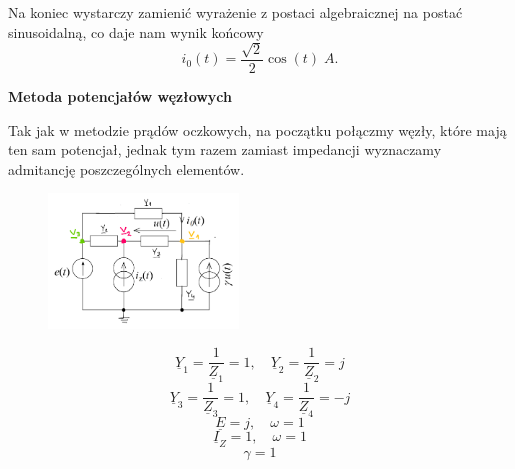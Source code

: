 \documentclass[12pt, a4paper]{article}
\begin{document}
Na koniec wystarczy zamienić wyrażenie z postaci algebraicznej na postać sinusoidalną,
co daje nam wynik końcowy
\begin{equation*}
  i_0(t) = \frac{\sqrt{2}}{2}\cos(t)\; A.
\end{equation*}

\begin{flushleft}
  \textbf{Metoda potencjałów węzłowych}
\end{flushleft}

Tak jak w metodzie prądów oczkowych, na początku połączmy węzły, które mają
ten sam potencjał, jednak tym razem zamiast impedancji wyznaczamy admitancję
poszczególnych elementów.
\begin{figure}[H]
  \centering
  \includegraphics[width = 0.45\textwidth]{./images/Lista_3/3.2.3_MPV.png}
\end{figure}

\begin{equation*}
  \underline{Y}_1 = \frac{1}{\underline{Z}_1} = 1, \quad \underline{Y}_2 = \frac{1}{\underline{Z}_2} = j
\end{equation*}
\begin{equation*}
  \underline{Y}_3 = \frac{1}{\underline{Z}_3} = 1, \quad \underline{Y}_4 = \frac{1}{\underline{Z}_4} = -j
\end{equation*}
\begin{equation*}
  \underline{E} = j, \quad \omega = 1
\end{equation*}
\begin{equation*}
  \underline{I}_Z = 1, \quad \omega = 1
\end{equation*}
\begin{equation*}
  \gamma = 1
\end{equation*}
\end{document}
